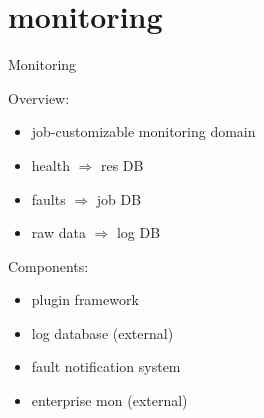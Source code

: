 \documentclass[default,pdf,colorBG,slideColor]{prosper}
\begin{document}
\part{monitoring}
\begin{slide}{Monitoring}{\small
\begin{minipage}{0.40\textwidth}
Overview:
\begin{itemize}
  \item{job-customizable monitoring domain}
  \item{health $\Longrightarrow$ res DB}
  \item{faults $\Longrightarrow$ job DB}
  \item{raw data $\Longrightarrow$ log DB}
\end{itemize}
\end{minipage}
\hfill
\begin{minipage}{0.50\textwidth}
Components:
\begin{itemize}
  \item{plugin framework}
  \item{log database (external)}
  \item{fault notification system}
  \item{enterprise mon (external)}
\end{itemize}
\end{minipage}
}\end{slide}
\end{document}
